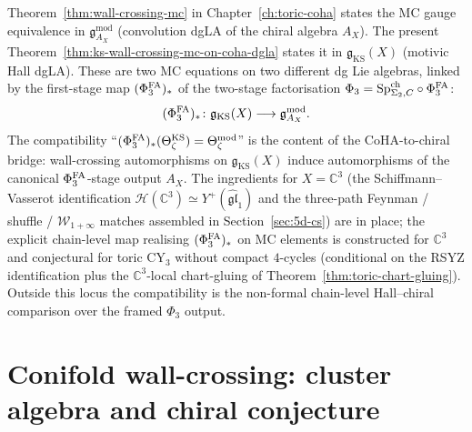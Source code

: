 \begin{remark}
\label{rem:two-mc-equations}
Theorem~\ref{thm:wall-crossing-mc} in Chapter~\ref{ch:toric-coha}
states the MC gauge equivalence
in $\mathfrak{g}^{\mathrm{mod}}_{A_X}$ (convolution dgLA of the chiral
algebra $A_X$). The present Theorem~\ref{thm:ks-wall-crossing-mc-on-coha-dgla}
states it in $\mathfrak{g}_{\mathrm{KS}}(X)$ (motivic Hall dgLA). These
are two MC equations on two different dg Lie algebras, linked by the
first-stage map $(\Phi^{\mathrm{FA}}_3)_*$ of the two-stage factorisation
$\Phi_3 = \mathrm{Sp}^{\mathrm{ch}}_{\Sigma_2,C} \circ \Phi^{\mathrm{FA}}_3$:
\[
 (\Phi^{\mathrm{FA}}_3)_* \colon \mathfrak{g}_{\mathrm{KS}}(X)
 \longrightarrow \mathfrak{g}^{\mathrm{mod}}_{A_X}.
\]
The compatibility ``$(\Phi^{\mathrm{FA}}_3)_*(\Theta_{\zeta}^{\mathrm{KS}})
= \Theta_\zeta^{\mathrm{mod}}$'' is the content of the
CoHA-to-chiral bridge: wall-crossing automorphisms on
$\mathfrak{g}_{\mathrm{KS}}(X)$ induce automorphisms of the canonical
$\Phi^{\mathrm{FA}}_3$-stage output $A_X$. The ingredients for $X = \mathbb{C}^3$
(the Schiffmann--Vasserot identification
$\mathcal{H}(\mathbb{C}^3) \simeq Y^+(\widehat{\mathfrak{gl}}_1)$ and
the three-path Feynman / shuffle / $\mathcal{W}_{1+\infty}$ matches
assembled in Section~\ref{sec:5d-cs}) are in place; the explicit
chain-level map realising $(\Phi^{\mathrm{FA}}_3)_*$ on MC elements is constructed
for $\mathbb{C}^3$ and conjectural for toric CY$_3$ without compact
$4$-cycles (conditional on the RSYZ identification plus the
$\mathbb{C}^3$-local chart-gluing of
Theorem~\ref{thm:toric-chart-gluing}). Outside this locus the
compatibility is the non-formal chain-level Hall--chiral comparison
over the framed $\Phi_3$ output.
\end{remark}

\section{Conifold wall-crossing: cluster algebra and chiral conjecture}
\label{sec:conifold-cluster-wall-crossing}

